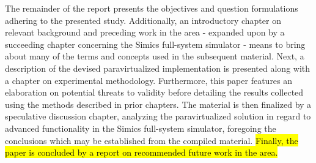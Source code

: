 The remainder of the report presents the objectives and question formulations adhering to the presented study.
Additionally, an introductory chapter on relevant background and preceding work in the area - expanded upon by a succeeding chapter concerning the Simics full-system simulator - means to bring about many of the terms and concepts used in the subsequent material.
Next, a description of the devised paravirtualized implementation is presented along with a chapter on experimental methodology.
Furthermore, this paper features an elaboration on potential threats to validity before detailing the results collected using the methods described in prior chapters.
The material is then finalized by a speculative discussion chapter, analyzing the paravirtualized solution in regard to advanced functionality in the Simics full-system simulator, foregoing the conclusions which may be established from the compiled material.
\hl{Finally, the paper is concluded by a report on recommended future work in the area.}
